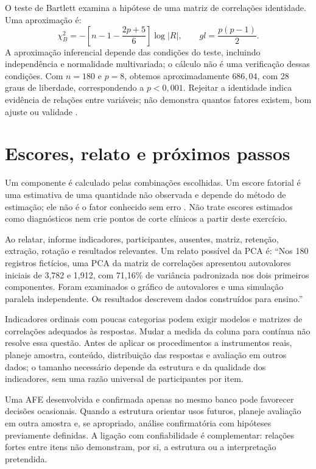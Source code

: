 O teste de Bartlett examina a hipótese de uma matriz de correlações identidade. Uma aproximação é:
\[
\chi^2_B=-\left[n-1-\frac{2p+5}{6}\right]\log|R|,
\qquad gl=\frac{p(p-1)}{2}.
\]
A aproximação inferencial depende das condições do teste, incluindo independência e normalidade multivariada; o cálculo não é uma verificação dessas condições. Com $n=180$ e $p=8$, obtemos aproximadamente $686{,}04$, com 28 graus de liberdade, correspondendo a $p<0{,}001$. Rejeitar a identidade indica evidência de relações entre variáveis; não demonstra quantos fatores existem, bom ajuste ou validade \parencite{RevelleBartlett}.

\section{Escores, relato e próximos passos}

Um componente é calculado pelas combinações escolhidas. Um escore fatorial é uma estimativa de uma quantidade não observada e depende do método de estimação; ele não é o fator conhecido sem erro \parencite{RevelleEscores}. Não trate escores estimados como diagnósticos nem crie pontos de corte clínicos a partir deste exercício.

Ao relatar, informe indicadores, participantes, ausentes, matriz, retenção, extração, rotação e resultados relevantes. Um relato possível da PCA é: ``Nos 180 registros fictícios, uma PCA da matriz de correlações apresentou autovalores iniciais de 3,782 e 1,912, com 71,16\% de variância padronizada nos dois primeiros componentes. Foram examinados o gráfico de autovalores e uma simulação paralela independente. Os resultados descrevem dados construídos para ensino.''

Indicadores ordinais com poucas categorias podem exigir modelos e matrizes de correlações adequados às respostas. Mudar a medida da coluna para contínua não resolve essa questão. Antes de aplicar os procedimentos a instrumentos reais, planeje amostra, conteúdo, distribuição das respostas e avaliação em outros dados; o tamanho necessário depende da estrutura e da qualidade dos indicadores, sem uma razão universal de participantes por item.

Uma AFE desenvolvida e confirmada apenas no mesmo banco pode favorecer decisões ocasionais. Quando a estrutura orientar usos futuros, planeje avaliação em outra amostra e, se apropriado, análise confirmatória com hipóteses previamente definidas. A ligação com confiabilidade é complementar: relações fortes entre itens não demonstram, por si, a estrutura ou a interpretação pretendida.

